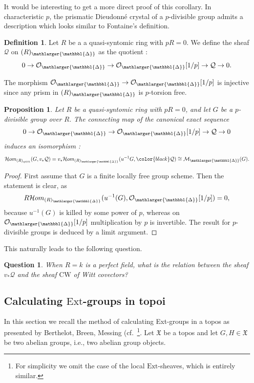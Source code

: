 \documentclass{amsart}
\newcommand{\prism}{{\mathlarger{\mathbbl{\Delta}}}}
\theoremstyle{plain}
\newtheorem{proposition}[theorem]{Proposition}
\newtheorem{question}[theorem]{Question}
\theoremstyle{definition}
\newtheorem{definition}[theorem]{Definition}
\newcommand{\red}[1]{{\color{black} #1}}
\begin{document}
It would be interesting to get a more direct proof of this corollary. In characteristic $p$, the prismatic Dieudonn\'e crystal of a $p$-divisible group admits a description which looks similar to Fontaine's definition.

\begin{definition}
Let $R$ be a a quasi-syntomic ring with $pR=0$. We define the sheaf $\mathcal{Q}$ on $(R)_{\prism}$ as the quotient :
\[ 0\to \mathcal{O}_\prism\to \mathcal{O}_\prism[1/p]\to \mathcal{Q}\to 0. \]
\end{definition}

The morphism $\mathcal{O}_\prism\to \mathcal{O}_\prism[1/p]$ is injective since any prism in $(R)_{\prism}$ is $p$-torsion free.

\begin{proposition}
Let $R$ be a quasi-syntomic ring with $pR=0$, and let $G$ be a $p$-divisible group over $R$. The \red{connecting map of the} canonical exact sequence $$0\to \mathcal{O}_\prism\to \mathcal{O}_\prism[1/p]\to \mathcal{Q}\to 0$$ induces an isomorphism :
$$
\mathcal{H}om_{(R)_{\mathrm{qsyn}}}(G,v_*\mathcal{Q})=v_*\mathcal{H}om_{(R)_{\prism}}(u^{-1}G, \red{\mathcal{Q}}) \cong \mathcal{M}_{\prism}(G).
$$
\end{proposition}
\begin{proof}
First assume that $G$ is a finite locally free group scheme. Then the statement is clear, as
$$
R\mathcal{H}om_{(R)_{\prism}}(u^{-1}(G),\mathcal{O}_\prism[1/p])=0,
$$
because $u^{-1}(G)$ is killed by some power of $p$, whereas on $\mathcal{O}_\prism[1/p]$ multiplication by $p$ is invertible. The result for $p$-divisible groups is deduced by a limit argument.
\end{proof}

This naturally leads to the following question.
\begin{question} \label{question_fontaine}
When $R=k$ is a perfect field, what is the relation between the sheaf $v_* \mathcal{Q}$ and the sheaf $\mathrm{CW}$ of Witt covectors?
\end{question} 

\subsection{Calculating $\mathrm{Ext}$-groups in topoi}
\label{sec:calc-ext-groups}

In this section we recall the method of calculating Ext-groups in a topos as presented by Berthelot, Breen, Messing (cf.\ \cite[2.1.5]{berthelot_breen_messing_theorie_de_dieudonne_cristalline_II}\footnote{For simplicity we omit the case of the local $\mathrm{Ext}$-sheaves, which is entirely similar.}.
Let $\mathfrak{X}$ be a topos and let $G,H\in \mathfrak{X}$ be two abelian groups, i.e., two abelian group objects.
\end{document}
